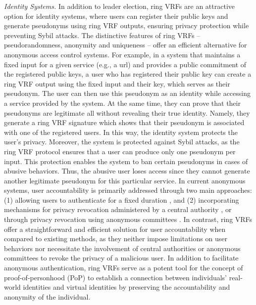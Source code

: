 \emph{Identity Systems.} In addition to leader election, ring VRFs are an attractive option for identity systems, where users can register their public keys and generate pseudonyms using ring VRF outputs, ensuring privacy protection while preventing Sybil attacks.  The distinctive features of ring VRFs -- pseudorandomness, anonymity and uniqueness -- offer an efficient alternative for anonymous access control systems. For example, in a system that maintains a fixed input for a given service (e.g., a url) and provides a public commitment of the registered public keys, a user who has registered their public key can create a ring VRF output using the fixed input and their key, which serves as their pseudonym.  The user can then use this pseudonym as an identity while accessing a service provided by the system. At the same time, they can prove that their pseudonyms  are  legitimate  all without revealing their true identity. Namely, they generate a ring VRF signature which shows that their pseudonym is associated with one of the registered users. In this way, the identity system protects the user's  privacy. Moreover, the  system is protected against Sybil attacks, as the ring VRF protocol ensures that a user can produce only one pseudonym per input. 
This protection enables the system to ban certain pseudonyms in cases of abusive behaviors. Thus, the abusive user loses access since they cannot generate  another legitimate pseudonym for this particular service.
In current anonymous systems, user accountability is primarily addressed through two main approaches: (1) allowing users to authenticate for a fixed duration \cite{limited_authentication1,limited_authentication2,limited_authentication3}, and (2) incorporating mechanisms for privacy revocation administered by a central authority \cite{revocation1,revocation2,revocation3,revocation4}, or through privacy revocation using anonymous committees \cite{anonymous-committee1,anonymous-committee2}.
In contrast, ring VRFs offer a straightforward and efficient solution for user accountability when compared to existing methods, as they neither impose limitations on user behaviors  nor necessitate the involvement of central authorities or anonymous committees to revoke the privacy of a malicious user.
In addition to facilitate anonymous authentication, ring VRFs  serve as a potent tool for the concept of proof-of-personhood (PoP) \cite{pop2008,pop2017,pop2020} to establish a connection between individuals' real-world identities and virtual identities by preserving the accountability and anonymity of the individual.
